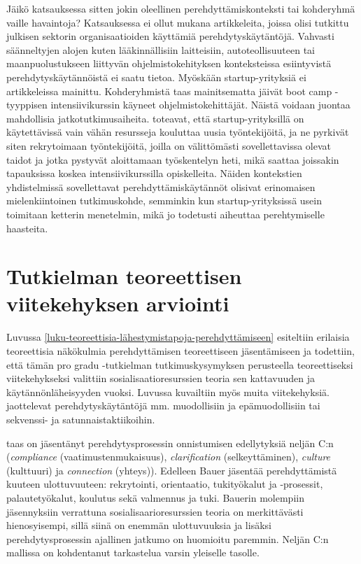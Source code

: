 \documentclass[utf8]{gradu3}
\begin{document}
Jäikö katsauksessa sitten jokin oleellinen perehdyttämiskonteksti tai kohderyhmä vaille havaintoja? Katsauksessa ei ollut mukana artikkeleita, joissa olisi tutkittu julkisen sektorin organisaatioiden käyttämiä perehdytyskäytäntöjä. Vahvasti säänneltyjen alojen kuten lääkinnällisiin laitteisiin, autoteollisuuteen tai maanpuolustukseen liittyvän ohjelmistokehityksen konteksteissa esiintyvistä perehdytyskäytännöistä ei saatu tietoa. Myöskään startup-yrityksiä ei artikkeleissa mainittu. Kohderyhmistä taas mainitsematta jäivät boot camp -tyyppisen intensiivikurssin käyneet ohjelmistokehittäjät. Näistä voidaan juontaa mahdollisia jatkotutkimusaiheita. \textcite{lyon-green-2021} toteavat, että startup-yrityksillä on käytettävissä vain vähän resursseja kouluttaa uusia työntekijöitä, ja ne pyrkivät siten rekrytoimaan työntekijöitä, joilla on välittömästi sovellettavissa olevat taidot ja jotka pystyvät aloittamaan työskentelyn heti, mikä saattaa joissakin tapauksissa koskea intensiivikurssilla opiskelleita. Näiden kontekstien yhdistelmissä sovellettavat perehdyttämiskäytännöt olisivat erinomaisen mielenkiintoinen tutkimuskohde, semminkin kun startup-yrityksissä usein toimitaan ketterin menetelmin, mikä jo todetusti aiheuttaa perehtymiselle haasteita.

\section{Tutkielman teoreettisen viitekehyksen arviointi}

Luvussa \ref{luku-teoreettisia-lähestymistapoja-perehdyttämiseen} esiteltiin erilaisia teoreettisia näkökulmia perehdyttämisen teoreettiseen jäsentämiseen ja todettiin, että tämän pro gradu -tutkielman tutkimuskysymyksen perusteella teoreettiseksi viitekehykseksi valittiin sosialisaatioresurssien teoria sen kattavuuden ja käytännönläheisyyden vuoksi. Luvussa kuvailtiin myös muita viitekehyksiä. \textcite{van-maanen-schein-1979} jaottelevat perehdytyskäytäntöjä mm. muodollisiin ja epämuodollisiin tai sekvenssi- ja satunnaistaktiikoihin. 

\textcite{bauer-2010} taas on jäsentänyt perehdytysprosessin onnistumisen edellytyksiä neljän C:n (\textit{compliance} (vaatimustenmukaisuus), \textit{clarification} (selkeyttäminen), \textit{culture} (kulttuuri) ja \textit{connection} (yhteys)). Edelleen Bauer jäsentää perehdyttämistä kuuteen ulottuvuuteen: rekrytointi, orientaatio, tukityökalut ja -prosessit, palautetyökalut, koulutus sekä valmennus ja tuki. Bauerin molempiin jäsennyksiin verrattuna sosialisaarioresurssien teoria \parencite{saks-gruman-2012} on merkittävästi hienosyisempi, sillä siinä on enemmän ulottuvuuksia ja lisäksi perehdytysprosessin ajallinen jatkumo on huomioitu paremmin. Neljän C:n mallissa \textcite{bauer-2010} on kohdentanut tarkastelua varsin yleiselle tasolle. 
\end{document}

